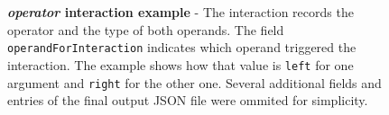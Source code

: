 \begin{figure}[h]
	\centering
	\begin{lrbox}{\mintedbox}
		\begin{minipage}{0.34\textwidth}
		\end{minipage}
	\end{lrbox}
	\hfill
	\begin{lrbox}{\mintedbox}
		\begin{minipage}{0.62\textwidth}
		\end{minipage}
	\end{lrbox}
	\caption[\textit{operator} interaction example]{\textbf{\textit{operator} interaction example} - The interaction records the operator and the type of both operands. The field \texttt{operandForInteraction} indicates which operand triggered the interaction. The example shows how that value is \texttt{left} for one argument and \texttt{right} for the other one. Several additional fields and entries of the final output JSON file were ommited for simplicity.}
	\label{fig:run-time-information-gathering-operator}
\end{figure}